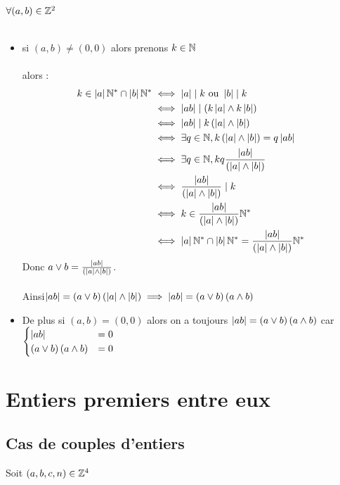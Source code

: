 \begin{dem}
    \(\forall (a,b) \in \Z^2\)\\~\\
    \begin{itemize}
        \item si \((a,b)\neq(0,0)\) alors prenons \(k \in \N\) \\~\\
        alors : 
        \begin{align*}
            k \in \abs{a}\Ns\inter\abs{b}\Ns &\iff \abs{a}\divise k \text{ ou } \abs{b}\divise k \\
            &\iff \abs{ab}\divise \paren{k\abs{a}\wedge k \abs{b}} \\
            &\iff \abs{ab} \divise k \paren{\abs{a}\wedge \abs{b}}\\
            &\iff \exists q\in \N,k \paren{\abs{a}\wedge \abs{b}} = q\abs{ab} \\
            &\iff \exists q\in \N,k q\frac{\abs{ab}}{\paren{\abs{a}\wedge \abs{b}}}\\
            &\iff \frac{\abs{ab}}{\paren{\abs{a}\wedge \abs{b}}} \divise k\\
            &\iff k \in \frac{\abs{ab}}{\paren{\abs{a}\wedge \abs{b}}} \Ns \\
            &\iff \abs{a}\Ns\inter\abs{b}\Ns = \frac{\abs{ab}}{\paren{\abs{a}\wedge \abs{b}}} \Ns 
        \end{align*}
        Donc \(a\vee b = \frac{\abs{ab}}{\paren{\abs{a}\wedge \abs{b}}}\).\\~\\
        Ainsi\(\abs{ab} =\paren{a \vee b}\paren{\abs{a}\wedge \abs{b}} \imp \abs{ab} =\paren{a \vee b}\paren{a\wedge b}\)
        \item De plus si \((a,b) = (0,0)\) alors on a toujours \(\abs{ab} =\paren{a \vee b}\paren{a\wedge b}\) car \(\begin{cases}
            \abs{ab} &= 0 \\
            \paren{a \vee b}\paren{a\wedge b}&=0
        \end{cases}\)
    \end{itemize}
\end{dem}

\section{Entiers premiers entre eux}
\subsection{Cas de couples d’entiers}
Soit \((a, b, c, n) \in \Z^4\)

